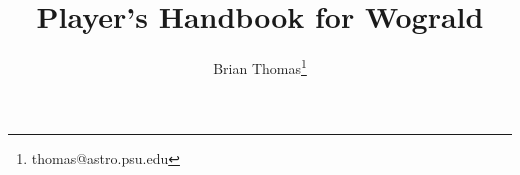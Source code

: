 \documentclass[12pt, a4paper]{report}
\title{Player's Handbook for Wograld}
\author{Brian Thomas\footnote{thomas@astro.psu.edu}}
\begin{document}
	  
\pagestyle{plain}
\renewcommand{\thepage}{\roman{page}}



\snglsp

\tableofcontents
\listoftables

\pagebreak

\sloppy
\setcounter{page}{1}
\renewcommand{\thepage}{\arabic{page}}









\appendix






% 
\end{document}
